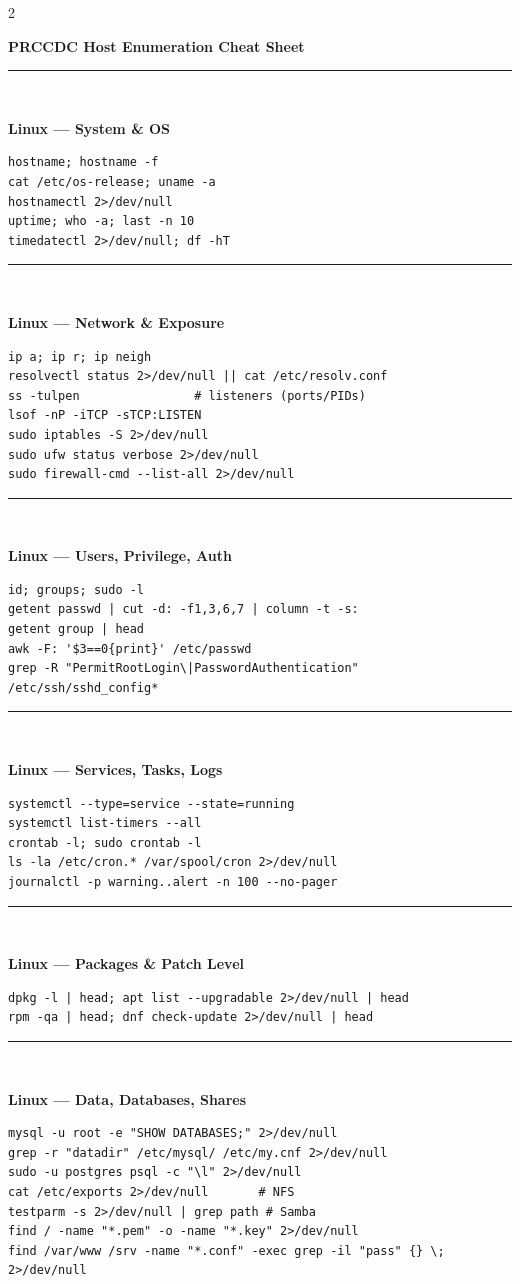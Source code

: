 \documentclass[9pt,landscape]{article}
\newcommand{\colorsec}[2]{%
  \vspace{0.8ex plus 0.3ex minus 0.3ex}%
  \noindent\rule{\linewidth}{0.4pt}\\[-0.8ex]%
  \noindent\colorbox{#1}{\parbox{\dimexpr\linewidth-2\fboxsep}{%
    \strut\textbf{\small\color{sblue} #2}}}%
  \vspace{0.3ex}\par\nobreak%
}
\begin{document}
\raggedright
\scriptsize
\begin{multicols}{2}

\setlength{\premulticols}{1pt}
\setlength{\postmulticols}{1pt}
\setlength{\multicolsep}{1pt}
\setlength{\columnsep}{8pt}

\begin{center}
     \large{\textbf{PRCCDC Host Enumeration Cheat Sheet}} \\
\end{center}

\colorsec{secteal}{Linux --- System \& OS}
\begin{lstlisting}
hostname; hostname -f
cat /etc/os-release; uname -a
hostnamectl 2>/dev/null
uptime; who -a; last -n 10
timedatectl 2>/dev/null; df -hT
\end{lstlisting}

\colorsec{secteal}{Linux --- Network \& Exposure}
\begin{lstlisting}
ip a; ip r; ip neigh
resolvectl status 2>/dev/null || cat /etc/resolv.conf
ss -tulpen                # listeners (ports/PIDs)
lsof -nP -iTCP -sTCP:LISTEN
sudo iptables -S 2>/dev/null
sudo ufw status verbose 2>/dev/null
sudo firewall-cmd --list-all 2>/dev/null
\end{lstlisting}

\colorsec{secpurple}{Linux --- Users, Privilege, Auth}
\begin{lstlisting}
id; groups; sudo -l
getent passwd | cut -d: -f1,3,6,7 | column -t -s:
getent group | head
awk -F: '$3==0{print}' /etc/passwd
grep -R "PermitRootLogin\|PasswordAuthentication" /etc/ssh/sshd_config*
\end{lstlisting}

\colorsec{secgreen}{Linux --- Services, Tasks, Logs}
\begin{lstlisting}
systemctl --type=service --state=running
systemctl list-timers --all
crontab -l; sudo crontab -l
ls -la /etc/cron.* /var/spool/cron 2>/dev/null
journalctl -p warning..alert -n 100 --no-pager
\end{lstlisting}

\colorsec{secyellow}{Linux --- Packages \& Patch Level}
\begin{lstlisting}
dpkg -l | head; apt list --upgradable 2>/dev/null | head
rpm -qa | head; dnf check-update 2>/dev/null | head
\end{lstlisting}

\colorsec{secorange}{Linux --- Data, Databases, Shares}
\begin{lstlisting}
mysql -u root -e "SHOW DATABASES;" 2>/dev/null
grep -r "datadir" /etc/mysql/ /etc/my.cnf 2>/dev/null
sudo -u postgres psql -c "\l" 2>/dev/null
cat /etc/exports 2>/dev/null       # NFS
testparm -s 2>/dev/null | grep path # Samba
find / -name "*.pem" -o -name "*.key" 2>/dev/null
find /var/www /srv -name "*.conf" -exec grep -il "pass" {} \; 2>/dev/null
\end{lstlisting}


\end{multicols}
\end{document}
